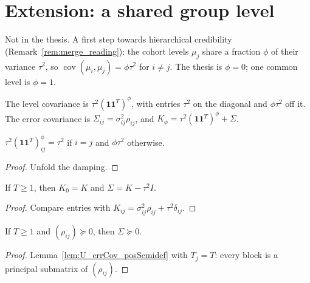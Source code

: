 \chapter{Extension: a shared group level}\label{ch:hierarchical}

Not in the thesis. A first step towards hierarchical credibility
(Remark~\ref{rem:merge_reading}): the cohort levels $\mu_j$ share a fraction
$\phi$ of their variance $\tau^2$, so $\operatorname{cov}(\mu_i,\mu_j) = \phi\tau^2$
for $i \ne j$. The thesis is $\phi = 0$; one common level is $\phi = 1$.

\begin{definition}\label{def:Kphi}
  \leanok
  The level covariance is $\tau^2 (\mathbf 1\mathbf 1^T)^\phi$, with entries
  $\tau^2$ on the diagonal and $\phi\tau^2$ off it. The error covariance is
  $\Sigma_{ij} = \sigma^2_{ij}\rho_{ij}$, and
  $K_\phi = \tau^2(\mathbf 1\mathbf 1^T)^\phi + \Sigma$.
\end{definition}

\begin{lemma}\label{lem:levelCov_apply}
  \leanok
  $\tau^2(\mathbf 1\mathbf 1^T)^\phi_{ij} = \tau^2$ if $i = j$ and $\phi\tau^2$ otherwise.
\end{lemma}
\begin{proof}
  \leanok
  Unfold the damping.
\end{proof}

\begin{lemma}[$\phi = 0$ is the thesis]\label{lem:Kphi_zero}
  \leanok
  If $T \ge 1$, then $K_0 = K$ and $\Sigma = K - \tau^2 I$.
\end{lemma}
\begin{proof}
  \leanok
  Compare entries with $K_{ij} = \sigma^2_{ij}\rho_{ij} + \tau^2\delta_{ij}$.
\end{proof}

\begin{lemma}\label{lem:errCov_posSemidef}
  \leanok
  If $T \ge 1$ and $(\rho_{ij}) \succeq 0$, then $\Sigma \succeq 0$.
\end{lemma}
\begin{proof}
  \leanok
  Lemma~\ref{lem:U_errCov_posSemidef} with $T_j = T$: every block is a
  principal submatrix of $(\rho_{ij})$.
\end{proof}

